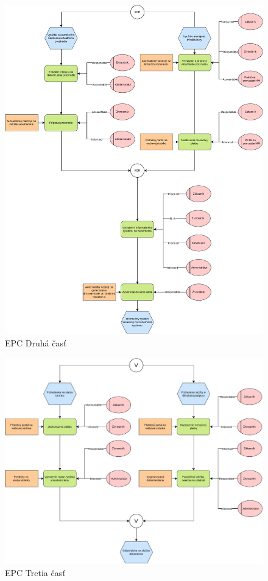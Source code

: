 \begin{figure}[htbp]
  \centering
  \includegraphics[width=\textwidth]{images/EPC_2.pdf}
  \caption{EPC Druhá časť}
  \label{ecc:2}
\end{figure}

\begin{figure}[htbp]
  \centering
  \includegraphics[width=\textwidth]{images/EPC_3.pdf}
  \caption{EPC Tretia časť}
  \label{ecc:3}
\end{figure}

